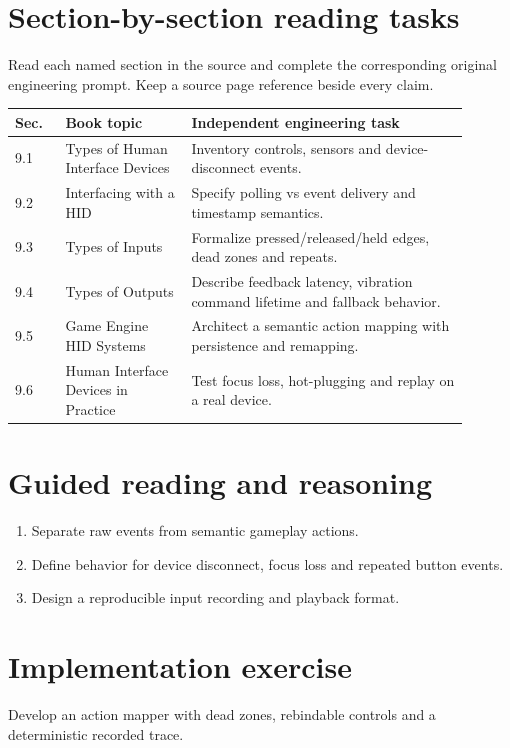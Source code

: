 \documentclass[11pt,letterpaper]{article}
\begin{document}
\section{Section-by-section reading tasks}
Read each named section in the source and complete the corresponding original engineering prompt. Keep a source page reference beside every claim.
\small\begin{longtable}{|p{0.10\linewidth}|p{0.25\linewidth}|p{0.55\linewidth}|}
\hline \textbf{Sec.} & \textbf{Book topic} & \textbf{Independent engineering task} \\ \hline\endhead
9.1 & Types of Human Interface Devices & Inventory controls, sensors and device-disconnect events. \\ \hline
9.2 & Interfacing with a HID & Specify polling vs event delivery and timestamp semantics. \\ \hline
9.3 & Types of Inputs & Formalize pressed/released/held edges, dead zones and repeats. \\ \hline
9.4 & Types of Outputs & Describe feedback latency, vibration command lifetime and fallback behavior. \\ \hline
9.5 & Game Engine HID Systems & Architect a semantic action mapping with persistence and remapping. \\ \hline
9.6 & Human Interface Devices in Practice & Test focus loss, hot-plugging and replay on a real device. \\ \hline
\end{longtable}\normalsize
\section{Guided reading and reasoning}
\begin{enumerate}
\item Separate raw events from semantic gameplay actions.
\item Define behavior for device disconnect, focus loss and repeated button events.
\item Design a reproducible input recording and playback format.
\end{enumerate}
\section{Implementation exercise}
Develop an action mapper with dead zones, rebindable controls and a deterministic recorded trace.
\end{document}
